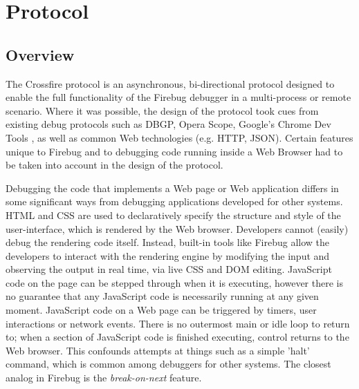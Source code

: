 \section {Protocol}
\subsection {Overview}
The Crossfire protocol is an asynchronous, bi-directional protocol designed to
enable the full functionality of the Firebug debugger in a multi-process or
remote scenario. Where it was possible, the design of the protocol took cues
from existing debug protocols such as DBGP\cite{dbgp}, Opera
Scope\cite{opera-scope}, Google's Chrome Dev Tools\cite{chrome-dev-tools} , as
well as common Web technologies (e.g. HTTP, JSON\cite{json}). Certain
features unique to Firebug and to debugging code running inside a Web Browser
had to be taken into account in the design of the protocol.

Debugging the code that implements a Web page or Web application differs in some
significant ways from debugging applications developed for other systems.
HTML and CSS are used to declaratively specify the structure and style of the
user-interface, which is rendered by the Web browser. Developers cannot (easily)
debug the rendering code itself. Instead, built-in tools like Firebug allow the
developers to interact with the rendering engine by modifying the input and
observing the output in real time, via live CSS and DOM editing. JavaScript code
on the page can be stepped through when it is executing, however there is no
guarantee that any JavaScript code is necessarily running at any given moment.
JavaScript code on a Web page can be triggered by timers, user interactions or
network events. There is no outermost main or idle loop to return to; when a
section of JavaScript code is finished executing, control returns to the Web
browser. This confounds attempts at things such as a simple 'halt' command,
which is common among debuggers for other systems. The closest analog in Firebug
is the \textit{break-on-next} feature.

